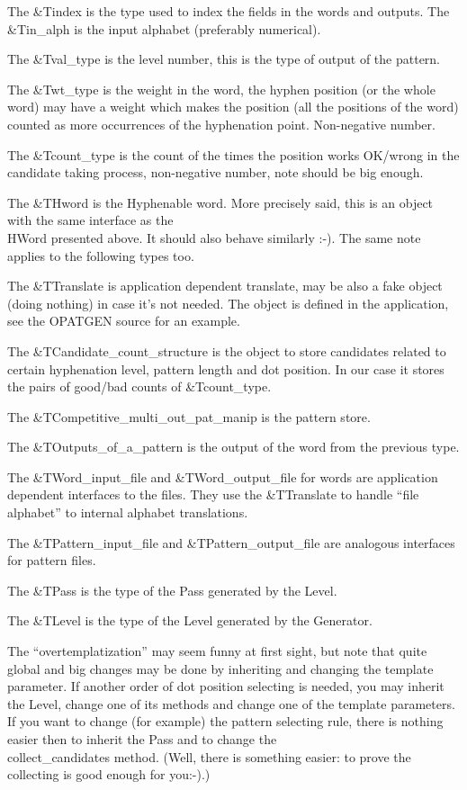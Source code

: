 The \&{Tindex} is the type used to index the fields in the words and outputs.
The \&{Tin\_alph} is the input alphabet (preferably numerical).

The \&{Tval\_type} is the level number, this is the type of output of the
pattern.

The \&{Twt\_type} is the weight in the word, the hyphen position (or the whole
word) may have a weight which makes the position (all the positions of the
word) counted as more occurrences of the hyphenation point. Non-negative
number.

The \&{Tcount\_type} is the count of the times the position works OK/wrong in
the candidate taking process, non-negative number, note should be big
enough.

The \&{THword} is the Hyphenable word. More precisely said, this is an
object with the same interface as the \\{HWord} presented above. It should
also behave similarly :-). The same note applies to the following types
too.

The \&{TTranslate} is application dependent translate, may be also a fake
object (doing nothing) in case it's not needed. The object is defined in
the application, see the OPATGEN source for an example.

The \&{TCandidate\_count\_structure} is the object to store candidates related
to certain hyphenation level, pattern length and dot position. In our case
it stores the pairs of good/bad counts of \&{Tcount\_type}.

The \&{TCompetitive\_multi\_out\_pat\_manip} is the pattern store.

The \&{TOutputs\_of\_a\_pattern} is the output of the word from the previous
type.

The \&{TWord\_input\_file} and \&{TWord\_output\_file} for words are
application
dependent interfaces to the files. They use the \&{TTranslate} to handle
``file alphabet'' to internal alphabet translations.

The \&{TPattern\_input\_file} and \&{TPattern\_output\_file} are analogous
interfaces for pattern files.

The \&{TPass} is the type of the Pass generated by the Level.

The \&{TLevel} is the type of the Level generated by the Generator.

The ``overtemplatization'' may seem funny at first sight, but note that
quite global and big changes may be done by inheriting and changing the
template parameter. If another order of dot position selecting is needed,
you may inherit the Level, change one of its methods and change one of the
template parameters. If you want to change (for example) the pattern
selecting rule, there is nothing easier then to inherit the Pass and to
change the \\{collect\_candidates} method. (Well, there is something easier:
to prove the collecting is good enough for you:-).)

